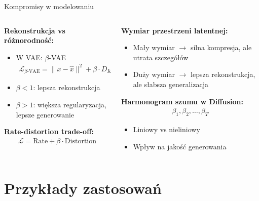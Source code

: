 \documentclass{beamer}
\begin{document}
\begin{frame}{Kompromisy w modelowaniu}
  \begin{columns}
    \begin{column}{0.5\textwidth}
      \textbf{Rekonstrukcja vs różnorodność:}
      \begin{itemize}
        \item W VAE: $\beta$-VAE
        \begin{align*}
          \mathcal{L}_{\beta\text{-VAE}} = \|x - \hat{x}\|^2 + \beta \cdot D_{KL}
        \end{align*}
        \item $\beta < 1$: lepsza rekonstrukcja
        \item $\beta > 1$: większa regularyzacja, lepsze generowanie
      \end{itemize}
      
      \textbf{Rate-distortion trade-off:}
      \begin{align*}
        \mathcal{L} = \text{Rate} + \beta \cdot \text{Distortion}
      \end{align*}
    \end{column}
    \begin{column}{0.5\textwidth}
      \textbf{Wymiar przestrzeni latentnej:}
      \begin{itemize}
        \item Mały wymiar $\rightarrow$ silna kompresja, ale utrata szczegółów
        \item Duży wymiar $\rightarrow$ lepsza rekonstrukcja, ale słabsza generalizacja
      \end{itemize}
      
      \textbf{Harmonogram szumu w Diffusion:}
      \begin{align*}
        \beta_1, \beta_2, \ldots, \beta_T
      \end{align*}
      \begin{itemize}
        \item Liniowy vs nieliniowy
        \item Wpływ na jakość generowania
      \end{itemize}
    \end{column}
  \end{columns}
\end{frame}

\section{Przykłady zastosowań}
\end{document}
